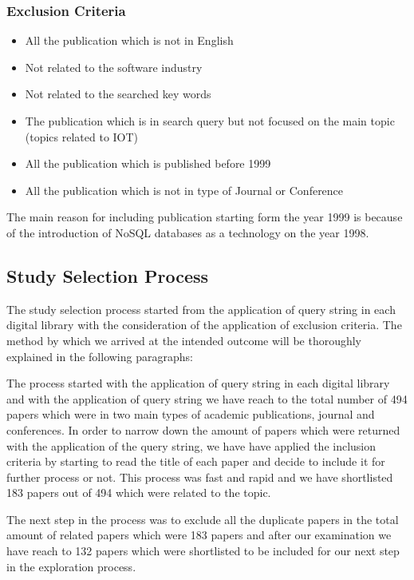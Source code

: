\documentclass[sigconf,nonacm]{acmart}
\begin{document}
\subsubsection{\textbf{Exclusion Criteria}}
\begin{itemize}
 \item  All the publication which is not in English
 \item  Not related to the software industry
 \item  Not related to the searched key words
 \item  The publication which is in search query but not focused on the main topic (topics related to IOT)
 \item  All the publication which is published before 1999
 \item  All the publication which is not in type of Journal or Conference
\end{itemize}

The main reason for including publication starting form the year 1999 is because of the introduction of NoSQL databases as a technology on the year 1998.

\subsection{Study Selection Process}
The study selection process started from the application of query string in each digital library with the consideration of the application of exclusion criteria. The method by which we arrived at the intended outcome will be thoroughly explained in the following paragraphs:
 
The process started with the application of query string in each digital library and with the application of query string we have reach to the total number of 494 papers which were in two main types of academic publications, journal and conferences. In order to narrow down the amount of papers which were returned with the application of the query string, we have have applied the inclusion criteria by starting to read the title of each paper and decide to include it for further process or not. This process was fast and rapid and we have shortlisted 183 papers out of 494 which were related to the topic.

The next step in the process was to exclude all the duplicate papers in the total amount of related papers which were 183 papers and after our examination we have reach to 132 papers which were shortlisted to be included for our next step in the exploration process.
\end{document}
